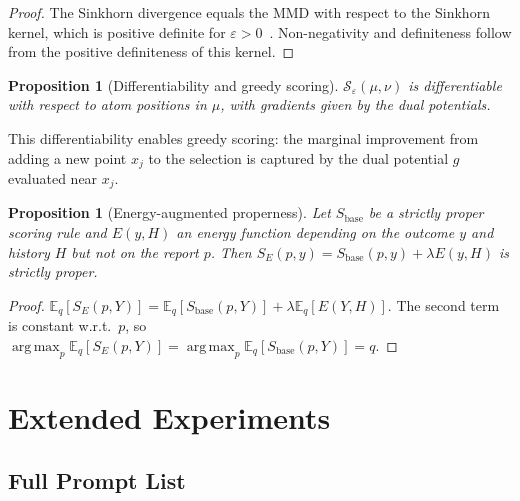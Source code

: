 \documentclass[10pt]{article}
\newtheorem{proposition}[theorem]{Proposition}
\DeclareMathOperator*{\argmax}{arg\,max}
\begin{document}
\begin{proof}
The Sinkhorn divergence equals the MMD with respect to the Sinkhorn kernel, which is positive definite for $\varepsilon > 0$~\citep{feydy2019interpolating}.
Non-negativity and definiteness follow from the positive definiteness of this kernel.
\end{proof}

\begin{proposition}[Differentiability and greedy scoring]
$\mathcal{S}_\varepsilon(\mu, \nu)$ is differentiable with respect to atom positions in $\mu$, with gradients given by the dual potentials.
\end{proposition}

This differentiability enables greedy scoring: the marginal improvement from adding a new point $x_j$ to the selection is captured by the dual potential $g$ evaluated near $x_j$.

\begin{proposition}[Energy-augmented properness]
\label{prop:energy-proper}
Let $S_{\mathrm{base}}$ be a strictly proper scoring rule and $E(y, H)$ an energy function depending on the outcome $y$ and history $H$ but not on the report $p$.
Then $S_E(p, y) = S_{\mathrm{base}}(p, y) + \lambda E(y, H)$ is strictly proper.
\end{proposition}

\begin{proof}
$\mathbb{E}_q[S_E(p, Y)] = \mathbb{E}_q[S_{\mathrm{base}}(p, Y)] + \lambda \mathbb{E}_q[E(Y, H)]$.
The second term is constant w.r.t.\ $p$, so $\argmax_p \mathbb{E}_q[S_E(p, Y)] = \argmax_p \mathbb{E}_q[S_{\mathrm{base}}(p, Y)] = q$.
\end{proof}

\section{Extended Experiments}
\label{app:extended}

\subsection{Full Prompt List}
\end{document}
